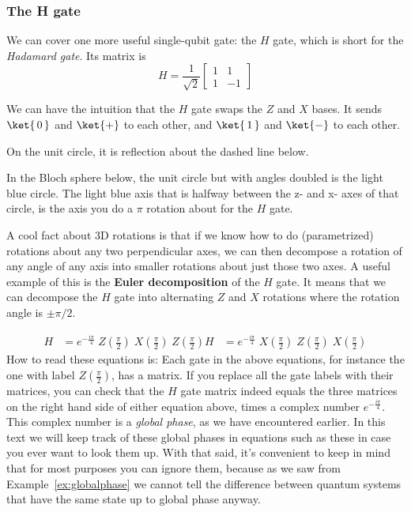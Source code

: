 \documentclass{article}
\theoremstyle{definition}
\newcommand{\kz}[1]{\ket{\,#1\,}}
\newcommand{\kx}[1]{\ket{#1}}
\begin{document}
\newpage
\subsubsection{The H gate}
We can cover one more useful single-qubit gate: the $H$ gate, which is short for the \textit{Hadamard gate}.  Its matrix is
\begin{equation}
	H = \frac{1}{\sqrt{2}}\begin{bmatrix}
		1 & 1\\
		1 & -1
	\end{bmatrix}
\end{equation}

We can have the intuition that the $H$ gate swaps the $Z$ and $X$ bases.
It sends $\kz0$ and $\kx+$ to each other, and $\kz1$ and $\kx-$ to each other.

On the unit circle, it is reflection about the dashed line below.
\begin{figure}[H]
	\label{fig:Hgate}
\end{figure}

In the Bloch sphere below, the unit circle but with angles doubled is the light blue circle.
The light blue axis that is halfway between the z- and x- axes of that circle, is the axis you do a $\pi$ rotation about for the $H$ gate.
\begin{figure}[H]
\end{figure}

A cool fact about 3D rotations is that if we know how to do (parametrized) rotations about any two perpendicular axes, we can then decompose a rotation of any angle of any axis into smaller rotations about just those two axes.
A useful example of this is the \textbf{Euler decomposition} of the $H$ gate.  It means that we can decompose the $H$ gate into alternating $Z$ and $X$ rotations where the rotation angle is $\pm \pi/2$.

\begin{align}
	H &= e^{-\frac{i\pi}{4}} \; Z\left(\frac{\pi}{2}\right) \; X\left(\frac{\pi}{2}\right) \; Z\left(\frac{\pi}{2}\right)
	H &= e^{-\frac{i\pi}{4}} \; X\left(\frac{\pi}{2}\right) \; Z\left(\frac{\pi}{2}\right) \; X\left(\frac{\pi}{2}\right)
\end{align}
How to read these equations is: Each gate in the above equations, for instance the one with label $Z\left(\frac{\pi}{2}\right)$, has a matrix.
If you replace all the gate labels with their matrices, you can check that the $H$ gate matrix indeed equals the three matrices on the right hand side of either equation above, times a complex number $e^{-\frac{i\pi}{4}}$.  This complex number is a \textit{global phase}, as we have encountered earlier.  In this text we will keep track of these global phases in equations such as these in case you ever want to look them up.  With that said, it's convenient to keep in mind that for most purposes you can ignore them, because as we saw from Example~\ref{ex:globalphase} we cannot tell the difference between quantum systems that have the same state up to global phase anyway.
\end{document}
